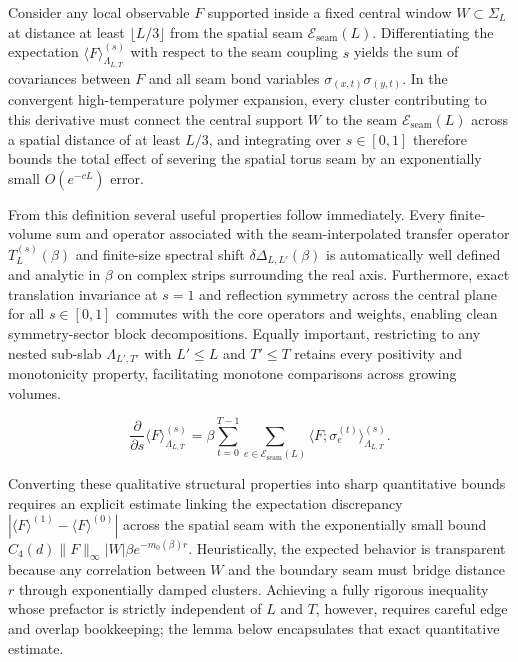\documentclass[11pt]{article}
\theoremstyle{definition}
\begin{document}
Consider any local observable $F$ supported inside a fixed central window $W \subset
\Sigma_L$ at distance at least $\lfloor L / 3 \rfloor$ from the spatial seam
$\mathcal{E}_{\mathrm{seam}}(L)$. Differentiating the expectation $\langle F
\rangle_{\Lambda_{L,T}}^{(s)}$ with respect to the seam coupling $s$ yields the sum
of covariances between $F$ and all seam bond variables $\sigma_{(x,t)}
\sigma_{(y,t)}$. In the convergent high-temperature polymer expansion, every cluster
contributing to this derivative must connect the central support $W$ to the seam
$\mathcal{E}_{\mathrm{seam}}(L)$ across a spatial distance of at least $L/3$, and
integrating over $s \in [0, 1]$ therefore bounds the total effect of severing the
spatial torus seam by an exponentially small $O(e^{-c L})$ error.

From this definition several useful properties follow immediately. Every
finite-volume sum and operator associated with the seam-interpolated transfer
operator $T_L^{(s)}(\beta)$ and finite-size spectral shift
$\delta\Delta_{L,L'}(\beta)$ is automatically well defined and analytic in $\beta$
on complex strips surrounding the real axis. Furthermore, exact translation
invariance at $s = 1$ and reflection symmetry across the central plane for all $s
\in [0, 1]$ commutes with the core operators and weights, enabling clean
symmetry-sector block decompositions. Equally important, restricting to any nested
sub-slab $\Lambda_{L',T'}$ with $L' \le L$ and $T' \le T$ retains every positivity
and monotonicity property, facilitating monotone comparisons across growing volumes.

\[
  \frac{\partial}{\partial s} \langle F \rangle_{\Lambda_{L,T}}^{(s)} = \beta \sum_{t=0}^{T-1} \sum_{e \in \mathcal{E}_{\mathrm{seam}}(L)} \langle F ; \sigma_e^{(t)} \rangle_{\Lambda_{L,T}}^{(s)}.
\]

Converting these qualitative structural properties into sharp quantitative bounds
requires an explicit estimate linking the expectation discrepancy $|\langle F
\rangle^{(1)} - \langle F \rangle^{(0)}|$ across the spatial seam with the
exponentially small bound $C_4(d) \|F\|_\infty |W| \beta e^{-m_0(\beta) r}$.
Heuristically, the expected behavior is transparent because any correlation between
$W$ and the boundary seam must bridge distance $r$ through exponentially damped
clusters. Achieving a fully rigorous inequality whose prefactor is strictly
independent of $L$ and $T$, however, requires careful edge and overlap bookkeeping;
the lemma below encapsulates that exact quantitative estimate.
\end{document}
